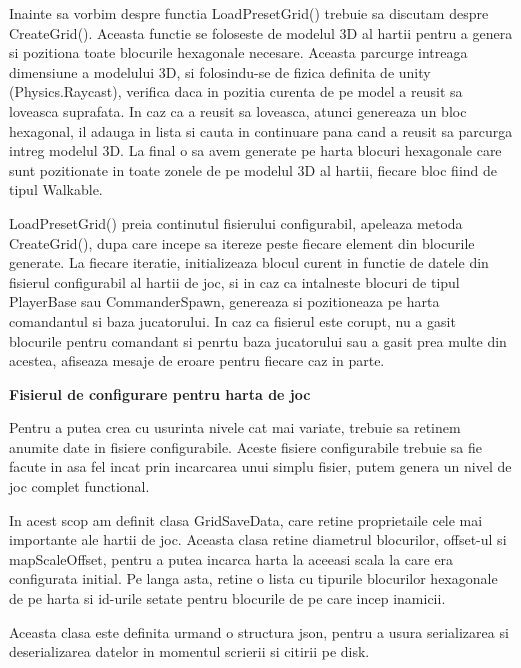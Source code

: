 \documentclass[12pt, a4paper]{article}
\begin{document}
	Inainte sa vorbim despre functia LoadPresetGrid() trebuie sa discutam despre CreateGrid(). Aceasta functie se foloseste de modelul 3D al hartii pentru a genera si pozitiona toate blocurile hexagonale necesare. Aceasta parcurge intreaga dimensiune a modelului 3D, si folosindu-se de fizica definita de unity (Physics.Raycast), verifica daca in pozitia curenta de pe model a reusit sa loveasca suprafata. In caz ca a reusit sa loveasca, atunci genereaza un bloc hexagonal, il adauga in lista si cauta in continuare pana cand a reusit sa parcurga intreg modelul 3D. La final o sa avem generate pe harta blocuri hexagonale care sunt pozitionate in toate zonele de pe modelul 3D al hartii, fiecare bloc fiind de tipul Walkable.
	\newline
	
	LoadPresetGrid() preia continutul fisierului configurabil, apeleaza metoda CreateGrid(), dupa care incepe sa itereze peste fiecare element din blocurile generate. La fiecare iteratie, initializeaza blocul curent in functie de datele din fisierul configurabil al hartii de joc, si in caz ca intalneste blocuri de tipul PlayerBase sau CommanderSpawn, genereaza si pozitioneaza pe harta comandantul si baza jucatorului. In caz ca fisierul este corupt, nu a gasit blocurile pentru comandant si penrtu baza jucatorului sau a gasit prea multe din acestea, afiseaza mesaje de eroare pentru fiecare caz in parte.
	\newline
	
	
	
	
	
	\textbf{Fisierul de configurare pentru harta de joc}
	
	Pentru a putea crea cu usurinta nivele cat mai variate, trebuie sa retinem anumite date in fisiere configurabile. Aceste fisiere configurabile trebuie sa fie facute in asa fel incat prin incarcarea unui simplu fisier, putem genera un nivel de joc complet functional.
	\newline
	
	In acest scop am definit clasa GridSaveData, care retine proprietaile cele mai importante ale hartii de joc. Aceasta clasa retine diametrul blocurilor, offset-ul si mapScaleOffset, pentru a putea incarca harta la aceeasi scala la care era configurata initial. Pe langa asta, retine o lista cu tipurile blocurilor hexagonale de pe harta si id-urile setate pentru blocurile de pe care incep inamicii.
	\newline
	
	Aceasta clasa este definita urmand o structura json, pentru a usura serializarea si deserializarea datelor in momentul scrierii si citirii pe disk.
	\newline
	
\end{document}
